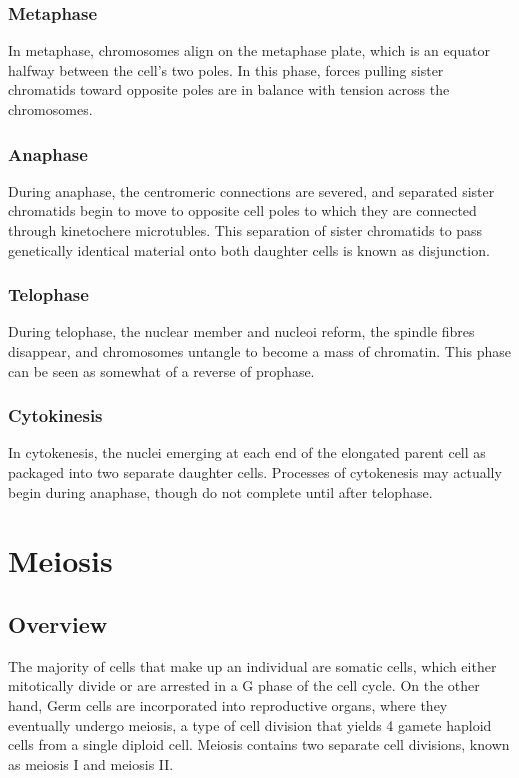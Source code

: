 \documentclass[12pt,titlepage]{article}
\begin{document}
        \subsubsection{Metaphase}
          In metaphase, chromosomes align on the metaphase plate, which is an equator halfway between the cell's two poles. In this phase, forces pulling sister
          chromatids toward opposite poles are in balance with tension across the chromosomes.

        \subsubsection{Anaphase}
          During anaphase, the centromeric connections are severed, and separated sister chromatids begin to move to opposite cell poles to which they are connected
          through kinetochere microtubles. This separation of sister chromatids to pass genetically identical material onto both daughter cells is known as disjunction.

        \subsubsection{Telophase}
          During telophase, the nuclear member and nucleoi reform, the spindle fibres disappear, and chromosomes untangle to become a mass of chromatin. This phase can be
          seen as somewhat of a reverse of prophase.

        \subsubsection{Cytokinesis}
          In cytokenesis, the nuclei emerging at each end of the elongated parent cell as packaged into two separate daughter cells. Processes of cytokenesis may actually
          begin during anaphase, though do not complete until after telophase.

    \section{Meiosis}

      \subsection{Overview}
        The majority of cells that make up an individual are somatic cells, which either mitotically divide or are arrested in a G phase of the cell cycle. On the other hand,
        Germ cells are incorporated into reproductive organs, where they eventually undergo meiosis, a type of cell division that yields 4 gamete haploid cells from a single
        diploid cell. Meiosis contains two separate cell divisions, known as meiosis I and meiosis II.
\end{document}

